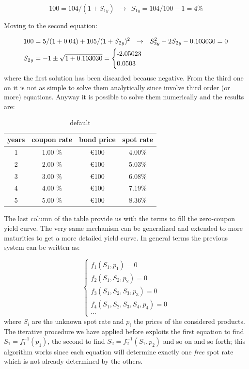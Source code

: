 \[100 = 104 / (1 + S_{1y})~~\rightarrow~~S_{1y} = 104/100 - 1 = 4\% \]

Moving to the second equation:

\begin{equation*}
\begin{split}
& 100 = 5 / (1 + 0.04) + 105 / (1 + S_{2y})^{2}~~\rightarrow~~S_{2y}^2  + 2 S_{2y}  - 0.103030 = 0 \\
& S_{2y} = - 1 \pm \sqrt{1 + 0.103030} = \begin{cases}\text{\sout{-2.05023}} \\ 0.0503\end{cases}
\end{split}
\end{equation*}
where the first solution has been discarded because negative.
From the third one on it is not as simple to solve them analytically since involve third order (or more) equations. Anyway it is possible to solve them numerically and the results are:

\begin{table}[htp]
\caption{default}
\begin{center}
\begin{tabular}{|c|c|c|c|}
\hline
\textbf{years} & \textbf{coupon rate} & \textbf{bond price} & \textbf{spot rate} \\
\hline
1 & 1.00 \% & \euro{100} & 4.00\% \\
\hline
2 & 2.00 \% & \euro{100} & 5.03\% \\
\hline
3 & 3.00 \% & \euro{100} & 6.08\% \\
\hline
4 & 4.00 \% & \euro{100} & 7.19\% \\
\hline
5 & 5.00 \% & \euro{100} & 8.36\% \\
\hline
\end{tabular}
\end{center}
\label{default}
\end{table}

The last column of the table provide us with the terms to fill the zero-coupon yield curve.
The very same mechanism can be generalized and extended to more maturities to get a more detailed yield curve. In general terms the previous system can be written as:

\begin{equation*}
\begin{cases}
f_1(S_1, p_1) = 0 \\
f_2(S_1, S_2, p_2) = 0 \\
f_3(S_1, S_2, S_3, p_3) = 0 \\
f_4(S_1, S_2, S_3, S_4, p_4) = 0 \\
\cdots
\end{cases}
\end{equation*}
where $S_i$ are the unknown spot rate and $p_i$ the prices of the considered products. The iterative procedure we have applied before exploits the first equation to find $S_1 = f_1^{-1}(p_1)$, the second to find $S_2 = f_2^{-1}(S_1, p_2)$ and so on and so forth; this algorithm works since each equation will determine exactly one \emph{free} spot rate which is not already determined by the others.


